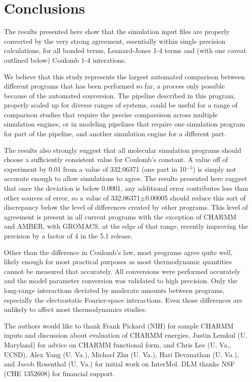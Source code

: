 \section*{Conclusions}
The results presented here show that the simulation input files are
properly converted by the very strong agreement, essentially within
single precision calculations, for all bonded terms, Lennard-Jones 1-4
terms and (with one caveat outlined below) Coulomb 1-4 interations. 

We believe that this study represents the largest automated comparison
between different programs that has been performed so far, a process
only possible because of the automated conversion. The pipeline
described in this program, properly scaled up for diverse ranges of
systems, could be useful for a range of comparison studies that
require the precise comparsison across multiple simulation engines, or
in modeling pipelines that require one simulation program for part of
the pipeline, and another simulation engine for a different part.

The results also strongly suggest that all molecular simulation
programs should choose a sufficiently consistent value for Coulomb's
constant. A value off of experiment by 0.01 from a value of 332.06371
(one part in 10$^{-5}$) is simply not accurate enough to allow
simulations to agree.  The results presented here suggest that once
the deviation is below 0.0001, any additional error contributes less
than other sources of error, so a value of 332.06371$\pm$0.00005
should reduce this sort of discrepancy below the level of differences
created by other programs.  This level of agreement is present in all
current programs with the exception of CHARMM and AMBER, with GROMACS,
at the edge of that range, recently improving the precision by a
factor of 4 in the 5.1 release.

Other than the difference in Coulomb's law, most programs agree quite
well, likely enough for most practical purposes as most thermodynamic
quantities cannot be measured that accurately.  All conversions were
performed accurately and the model parameter conversion was validated
to high precision. Only the long-range interactions deviated by
moderate amounts between programs, especially the electrostatic
Fourier-space interactions.  Even those differences are unlikely to
affect most thermodynamics studies.

\begin{acknowledgements}
The authors would like to thank Frank Pickard (NIH) for sample CHARMM
inputs and discussion about evaluation of CHARMM energies, Justin
Lemkul (U. Maryland) for advice on CHARMM functional form, and Chris
Lee (U. Va., UCSD), Alex Yang (U. Va.), Michael Zhu (U. Va.), Hari
Devanathan (U. Va.), and Jacob Rosenthal (U. Va.)  for initial work on
InterMol. DLM thanks NSF (CHE 1352608) for financial support.
\end{acknowledgements}

